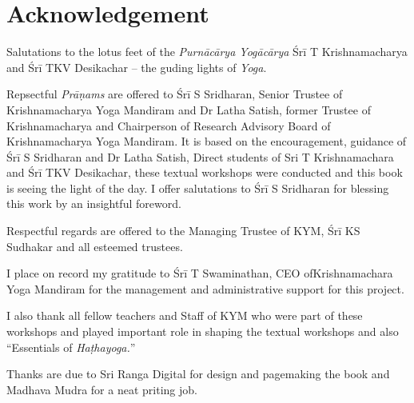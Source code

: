 \thispagestyle{empty}

\chapter*{Acknowledgement}\label{ack}

Salutations to the lotus feet of the \textit{Purnācārya Yogācārya} Śrī T Krishnamacharya and Śrī TKV Desikachar – the guding lights of \textit{Yoga}.

Repsectful \textit{Prāṇams} are offered to Śrī S Sridharan, Senior Trustee of Krishnamacharya Yoga Mandiram and Dr Latha Satish, former Trustee of Krishnamacharya and Chairperson of Research Advisory Board of Krishnamacharya Yoga Mandiram. It is based on the encouragement, guidance of Śrī S Sridharan and Dr Latha Satish, Direct students of Sri T Krishnamachara and Śrī TKV Desikachar, these textual workshops were conducted and this book is seeing the light of the day. I offer salutations to Śrī S Sridharan for blessing this work by an insightful foreword. 

Respectful regards are offered to the Managing Trustee of KYM, Śrī KS Sudhakar and all esteemed trustees. 

I place on record my gratitude to Śrī T Swaminathan, CEO of\break Krishnamachara Yoga Mandiram for the management and administrative support for this project. 

I also thank all fellow teachers and Staff of KYM who were part of these workshops and played important role in shaping the textual workshops and also “Essentials of \textit{Haṭhayoga.}”

Thanks are due to Sri Ranga Digital for design and pagemaking the book and Madhava Mudra for a neat priting job.

